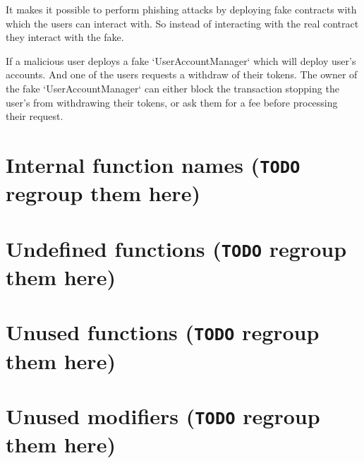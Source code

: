 It makes it possible to perform phishing attacks by deploying fake contracts with which the users can interact with. So instead of interacting with the real contract they interact with the fake. 

If a malicious user deploys a fake `UserAccountManager` which will deploy user's accounts. And one of the users requests a withdraw of their tokens. The owner of the fake `UserAccountManager` can either block the transaction stopping the user's from withdrawing their tokens, or ask them for a fee before processing their request.





\section{Internal function names ({\tt TODO} regroup them here)}

\section{Undefined functions ({\tt TODO} regroup them here)}

\section{Unused functions ({\tt TODO} regroup them here)}

\section{Unused modifiers ({\tt TODO} regroup them here)}


























